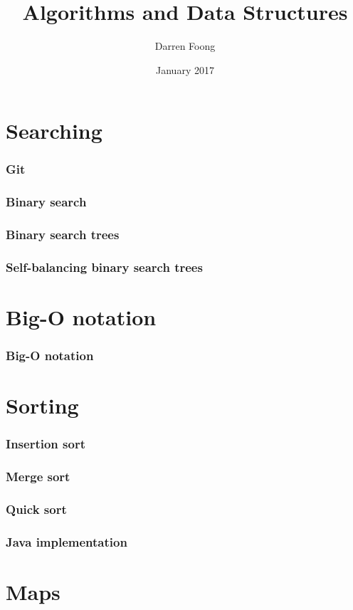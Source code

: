 \documentclass{beamer}
\title{Algorithms and Data Structures}
\author{Darren Foong}
\date{January 2017}
\begin{document}
\begin{frame}
 \titlepage
\end{frame}

\section{Searching}

\begin{frame}
 \frametitle{Git}
\end{frame}

\begin{frame}
 \frametitle{Binary search}
\end{frame}

\begin{frame}
 \frametitle{Binary search trees}
\end{frame}

\begin{frame}
 \frametitle{Self-balancing binary search trees}
\end{frame}

\section{Big-O notation}

\begin{frame}
 \frametitle{Big-O notation}
\end{frame}

\section{Sorting}

\begin{frame}
 \frametitle{Insertion sort}
\end{frame}

\begin{frame}
 \frametitle{Merge sort}
\end{frame}

\begin{frame}
 \frametitle{Quick sort}
\end{frame}

\begin{frame}
 \frametitle{Java implementation}
\end{frame}

\section{Maps}
\end{document}
